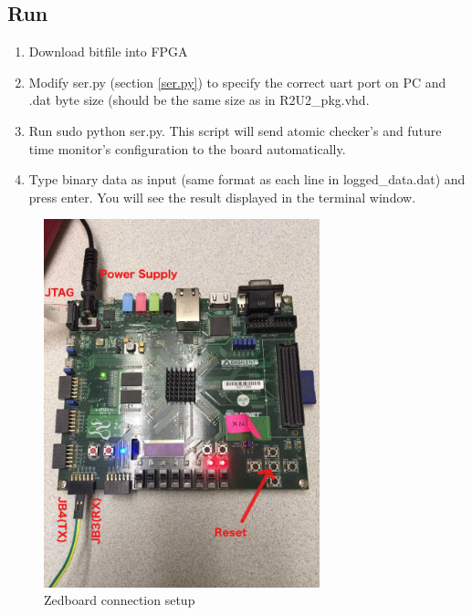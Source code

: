 \documentclass{article}
\theoremstyle{definition}
\begin{document}
\subsection{Run}
\begin{enumerate}
	\item Download bitfile into FPGA
	\item Modify \textcolor{green!100}{ser.py} (section \ref{ser.py}) to specify the correct uart port on PC and .dat byte size (should be the same size as in \textcolor{purple!30}{R2U2\_pkg.vhd}.
	\item Run  \colorbox{blue!30}{sudo python ser.py}. This script will send atomic checker's and future time monitor's configuration to the board automatically.
	\item Type binary data as input (same format as each line in \textcolor{purple!30}{logged\_data.dat}) and press enter. You will see the result displayed in the terminal window.
\end{enumerate}

\begin{figure}[h]
\caption{Zedboard connection setup}
\label{FPGA}
\includegraphics[width=8cm]{./fig/FPGA.jpg}
\centering
\end{figure}
\end{document}
